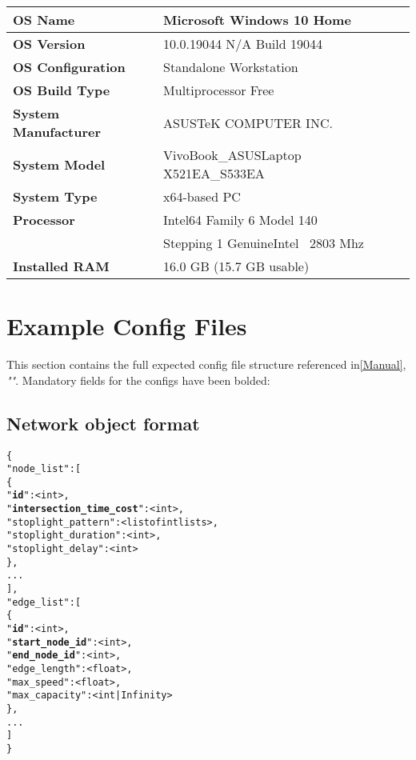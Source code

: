 \begin{center}
    \noindent \begin{tabular}{l l}  %
    \toprule
    \textbf{OS Name} & Microsoft Windows 10 Home\\
    \midrule
    \textbf{OS Version} & 10.0.19044 N/A Build 19044\\
    \midrule
    \textbf{OS Configuration} & Standalone Workstation\\
    \midrule
    \textbf{OS Build Type} & Multiprocessor Free\\
    \midrule
    \textbf{System Manufacturer} & ASUSTeK COMPUTER INC.\\
    \midrule
    \textbf{System Model} & VivoBook\_ASUSLaptop X521EA\_S533EA\\
    \midrule
    \textbf{System Type} &  x64-based PC\\
    \midrule
    \textbf{Processor} & Intel64 Family 6 Model 140 \\
    & Stepping 1 GenuineIntel ~2803 Mhz \\
    \midrule
    \textbf{Installed RAM} & 16.0 GB (15.7 GB usable)\\
    \bottomrule
    \end{tabular}
\end{center}

 
\section{Example Config Files}
\label{Configs}
This section contains the full expected config file structure referenced in\autoref{Manual}, \textit{""}.  Mandatory fields for the configs have been bolded:

\subsection{Network object format}

\begin{alltt}
\{
    "node_list": [
        \{
            "\textbf{id}": <int>,
            "\textbf{intersection_time_cost}": <int>,
            "stoplight_pattern": <list of int lists>,
            "stoplight_duration": <int>,
            "stoplight_delay": <int>
        \},
        ...
    ],
    "edge_list": [
        \{
            "\textbf{id}": <int>,
            "\textbf{start_node_id}": <int>,
            "\textbf{end_node_id}": <int>,
            "edge_length": <float>,
            "max_speed": <float>,
            "max_capacity": <int | Infinity>
        \},
        ...
    ]
\}
\end{alltt}


